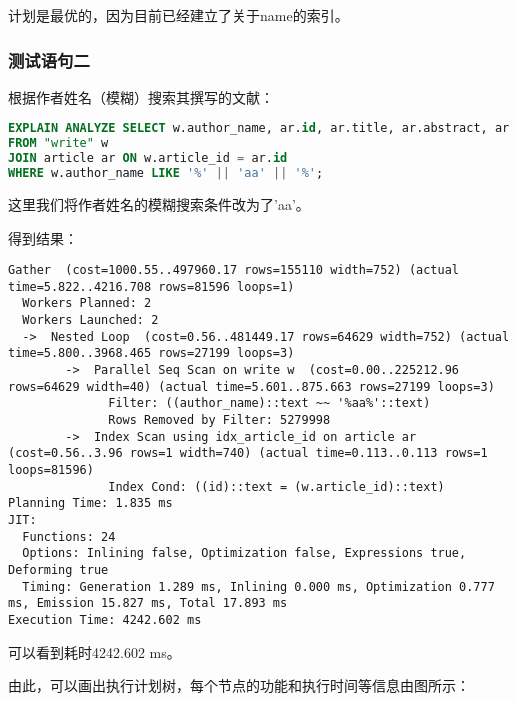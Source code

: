 \documentclass{article}
\begin{document}
计划是最优的，因为目前已经建立了关于name的索引。

\subsubsection{测试语句二}

根据作者姓名（模糊）搜索其撰写的文献：
\begin{lstlisting}[language=sql]
EXPLAIN ANALYZE SELECT w.author_name, ar.id, ar.title, ar.abstract, ar.doi, ar.license, ar.publish_time, ar.url
FROM "write" w
JOIN article ar ON w.article_id = ar.id
WHERE w.author_name LIKE '%' || 'aa' || '%';
\end{lstlisting}

这里我们将作者姓名的模糊搜索条件改为了'aa'。

得到结果：

\begin{lstlisting}
Gather  (cost=1000.55..497960.17 rows=155110 width=752) (actual time=5.822..4216.708 rows=81596 loops=1)
  Workers Planned: 2
  Workers Launched: 2
  ->  Nested Loop  (cost=0.56..481449.17 rows=64629 width=752) (actual time=5.800..3968.465 rows=27199 loops=3)
        ->  Parallel Seq Scan on write w  (cost=0.00..225212.96 rows=64629 width=40) (actual time=5.601..875.663 rows=27199 loops=3)
              Filter: ((author_name)::text ~~ '%aa%'::text)
              Rows Removed by Filter: 5279998
        ->  Index Scan using idx_article_id on article ar  (cost=0.56..3.96 rows=1 width=740) (actual time=0.113..0.113 rows=1 loops=81596)
              Index Cond: ((id)::text = (w.article_id)::text)
Planning Time: 1.835 ms
JIT:
  Functions: 24
  Options: Inlining false, Optimization false, Expressions true, Deforming true
  Timing: Generation 1.289 ms, Inlining 0.000 ms, Optimization 0.777 ms, Emission 15.827 ms, Total 17.893 ms
Execution Time: 4242.602 ms
\end{lstlisting}

可以看到耗时4242.602 ms。

由此，可以画出执行计划树，每个节点的功能和执行时间等信息由图所示：
\end{document}
